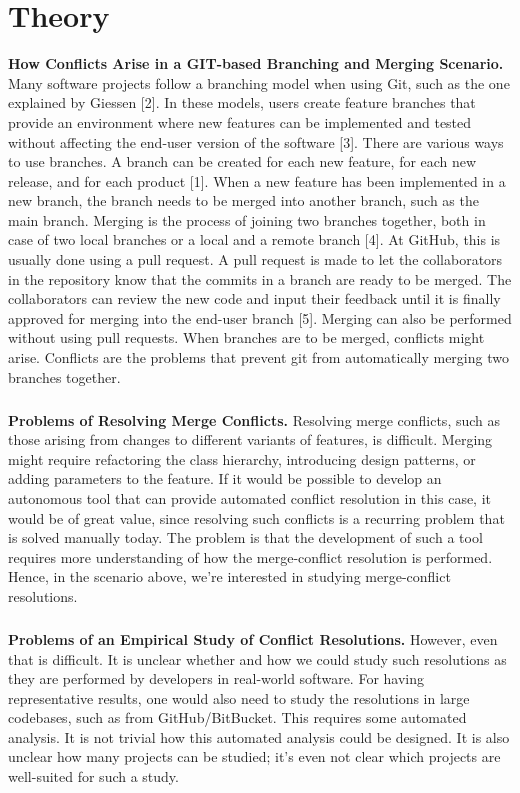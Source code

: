 \chapter{Theory}
\textbf{How Conflicts Arise in a GIT-based Branching and Merging Scenario.} Many software projects follow a branching model when using Git, such as the one explained by Giessen [2]. In these models, users create feature branches that provide an environment where new features can be implemented and tested without affecting the end-user version of the software [3]. There are various ways to use branches. A branch can be created for each new feature, for each new release, and for each product [1]. When a new feature has been implemented in a new branch, the branch needs to be merged into another branch, such as the main branch. Merging is the process of joining two branches together, both in case of two local branches or a local and a remote branch [4]. At GitHub, this is usually done using a pull request. A pull request is made to let the collaborators in the repository know that the commits in a branch are ready to be merged. The collaborators can review the new code and input their feedback until it is finally approved for merging into the end-user branch [5]. Merging can also be performed without using pull requests. When branches are to be merged, conflicts might arise. Conflicts are the problems that prevent git from automatically merging two branches together.

\paragraph*{}
\textbf{Problems of Resolving Merge Conflicts.} Resolving merge conflicts, such as those arising from changes to different variants of features, is difficult. Merging might require refactoring the class hierarchy, introducing design patterns, or adding parameters to the feature. If it would be possible to develop an autonomous tool that can provide automated conflict resolution in this case, it would be of great value, since resolving such conflicts is a recurring problem that is solved manually today. The problem is that the development of such a tool requires more understanding of how the merge-conflict resolution is performed. Hence, in the scenario above, we’re interested in studying merge-conflict resolutions.

\paragraph*{}
\textbf{Problems of an Empirical Study of Conflict Resolutions.} However, even that is difficult. It is unclear whether and how we could study such resolutions as they are performed by developers in real-world software. For having representative results, one would also need to study the resolutions in large codebases, such as from GitHub/BitBucket. This requires some automated analysis. It is not trivial how this automated analysis could be designed. It is also unclear how many projects can be studied; it’s even not clear which projects are well-suited for such a study.

